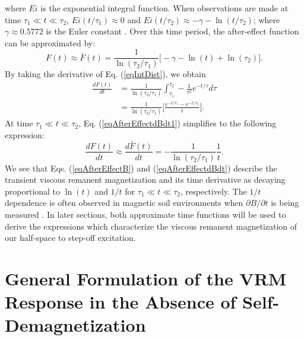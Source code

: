 \documentclass[journal]{IEEEtran}  %
\begin{document}
where $Ei$ is the  exponential integral function. When observations
are made at time $\tau_1 \ll t \ll \tau_2$, $Ei (t/\tau_1) \approx
0$ and $Ei (t/\tau_2) \approx -\gamma - \ln(t/\tau_2)$; where
$\gamma \approx 0.5772$ is the Euler constant \cite{Pasion2007}.
Over this time period, the after-effect function can be approximated
by:
\begin{equation}
\label{eqAfterEffectB} F(t) \approx \bar F(t) =
\frac{1}{\ln(\tau_2/\tau_1)} \big [ - \gamma - \ln(t) + \ln(\tau_2)
\big ].
\end{equation}
By taking the derivative of Eq. (\ref{eqIntDist}), we obtain
\begin{align}
\label{eqAfterEffectdBdt1}
\frac{d F(t)}{dt} &= \frac{1}{\ln(\tau_2/\tau_1)} \int^{\tau_2}_{\tau_1} - \frac{1}{\tau^2} e^{-t/\tau} d \tau \nonumber \\
& = \frac{1}{\ln(\tau_2/\tau_1)} \Bigg [ \frac{e^{-t/\tau_1}
-e^{-t/\tau_2} }{t} \Bigg ].
\end{align}
At time $\tau_1 \ll t \ll \tau_2$, Eq. (\ref{eqAfterEffectdBdt1}) simplifies to the following expression:
\begin{equation}
\label{eqAfterEffectdBdt} \frac{dF(t)}{d t} \approx \frac{d \bar
F(t)}{d t} = -\frac{1}{\ln(\tau_2/\tau_1)} \frac{1}{t}.
\end{equation}
We see that Eqs. (\ref{eqAfterEffectB}) and
(\ref{eqAfterEffectdBdt}) describe the transient  viscous remanent 
magnetization and its time derivative as decaying proportional to $\ln(t)$
and $1/t$ for $\tau_1 \ll t \ll \tau_2$, respectively. The $1/t$
dependence is often observed in magnetic soil environments when
$\partial B/\partial t$ is being measured
\cite{Dabas1992,Buselli1982,Pasion2007}. In later sections, both
approximate time functions will be used to derive the expressions which
characterize the viscous remanent magnetization of our
half-space to step-off excitation.




\section{General Formulation of the VRM Response in the Absence of Self-Demagnetization}
\label{secSelfDemag}
\end{document}
